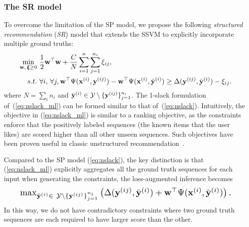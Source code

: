 \subsubsection{The SR model}
To overcome the limitation of the SP model,
we propose the following \emph{structured recommendation} (\emph{SR}) model that extends the SSVM to explicitly incorporate multiple ground truths: %
\begin{equation}
\label{eq:nslack_ml}
\resizebox{0.909\linewidth}{!}{$
\begin{aligned}
\min_{\w, \, \bm{\xi} \ge 0} \ & \frac{1}{2} \w^\top \w + \frac{C}{N} \sum_{i=1}^n \sum_{j=1}^{n_i} \xi_{ij}, \\
s.t. \ & \forall i, \, \forall j,
  \w^\top \Psi(\x^{(i)}, \y^{(ij)}) - \w^\top \Psi(\x^{(i)}, \bar{\y}^{(i)}) \ge
  \Delta(\y^{(ij)}, \bar{\y}^{(i)}) - \xi_{ij}.
\end{aligned}
$}
\end{equation}
where $N = \sum_i n_i$ and $\bar{\mathbf{y}}^{(i)} \in \mathcal{Y} \setminus \{\mathbf{y}^{(ij)}\}_{j=1}^{n_i}$.
The 1-slack formulation of~(\ref{eq:nslack_ml}) can be formed similar to that of~(\ref{eq:nslack}).
Intuitively, the objective in (\ref{eq:nslack_ml}) is similar to a ranking objective, as the constraints enforce
that the positively labeled sequences (the known items that the user likes) are scored
higher than all other unseen sequences.
Such objectives have been proven useful in classic unstructured recommendation~\cite{bpr09}.

Compared to the SP model (\ref{eq:nslack}), the key distinction is that (\ref{eq:nslack_ml})
explicitly aggregates all the ground truth sequences for each input when generating the constraints,
\ie the loss-augmented inference becomes
\begin{equation}
\label{eq:loss_aug_inf}
\resizebox{0.909\linewidth}{!}{$
\max_{\bar{\y}^{(i)} \in \ \mathcal{Y} \setminus \{\y^{(ij)}\}_{j=1}^{n_i}}
     \left( \Delta(\y^{(ij)}, \bar{\y}^{(i)}) + \w^\top \Psi(\x^{(i)}, \bar\y^{(i)}) \right).
$}
\end{equation}
In this way, we do not have contradictory constraints where
two ground truth sequences are each required to have larger score than the other.

